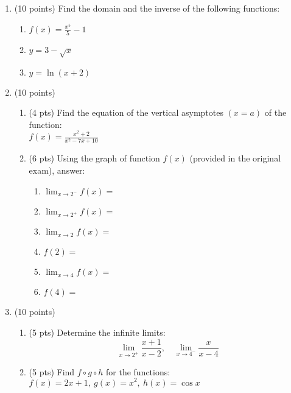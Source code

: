 \documentclass[12pt]{article}
\begin{document}
\vspace{1cm}

\begin{enumerate}
    \item (10 points) Find the domain and the inverse of the following functions:
    \begin{enumerate}
        \item \( f(x) = \frac{x^5}{5} - 1 \)
        \item \( y = 3 - \sqrt{x} \)
        \item \( y = \ln(x + 2) \)
    \end{enumerate}

    \item (10 points)
    \begin{enumerate}
        \item (4 pts) Find the equation of the vertical asymptotes \( (x = a) \) of the function: \\
        \( f(x) = \frac{x^2 + 2}{x^2 - 7x + 10} \)

        \item (6 pts) Using the graph of function \( f(x) \) (provided in the original exam), answer:
        \begin{enumerate}
            \item \( \lim_{x \to 2^-} f(x) = \)
            \item \( \lim_{x \to 2^+} f(x) = \)
            \item \( \lim_{x \to 2} f(x) = \)
            \item \( f(2) = \)
            \item \( \lim_{x \to 4} f(x) = \)
            \item \( f(4) = \)
        \end{enumerate}
    \end{enumerate}

    \item (10 points)
    \begin{enumerate}
        \item (5 pts) Determine the infinite limits:
        \[
        \lim_{x \to 2^+} \frac{x + 1}{x - 2}, \quad 
        \lim_{x \to 4^-} \frac{x}{x - 4}
        \]

        \item (5 pts) Find \( f \circ g \circ h \) for the functions: \\
        \( f(x) = 2x + 1,\ g(x) = x^2,\ h(x) = \cos x \)
    \end{enumerate}


\end{enumerate}
\end{document}
